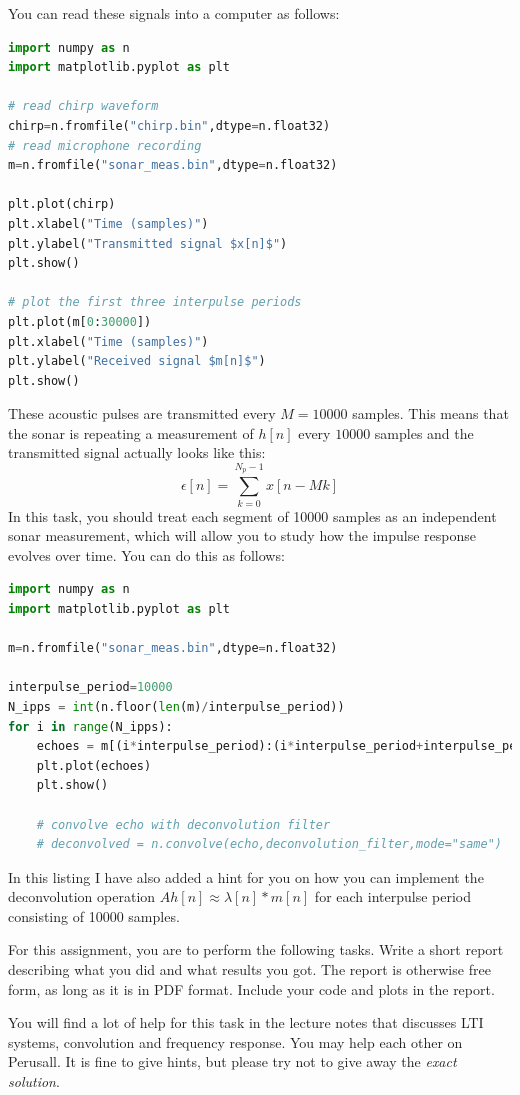 You can read these signals into a
computer as follows:
\begin{lstlisting}[language=Python,numbers=none]
import numpy as n
import matplotlib.pyplot as plt

# read chirp waveform
chirp=n.fromfile("chirp.bin",dtype=n.float32)
# read microphone recording 
m=n.fromfile("sonar_meas.bin",dtype=n.float32)

plt.plot(chirp)
plt.xlabel("Time (samples)")
plt.ylabel("Transmitted signal $x[n]$")
plt.show()

# plot the first three interpulse periods 
plt.plot(m[0:30000])
plt.xlabel("Time (samples)")
plt.ylabel("Received signal $m[n]$")
plt.show()
\end{lstlisting}
These acoustic pulses are transmitted every $M=10000$ samples. This
means that the sonar is repeating a measurement of $h[n]$ every
$10000$ samples and the transmitted signal actually looks like this:
\begin{equation}
  \epsilon[n] = \sum_{k=0}^{N_p-1} x[n - Mk]
\end{equation}
In this task, you should treat each segment of 10000 samples as an
independent sonar measurement, which will allow you to study how the
impulse response evolves over time. You can do this as follows:
\begin{lstlisting}[language=Python,numbers=none]
import numpy as n
import matplotlib.pyplot as plt

m=n.fromfile("sonar_meas.bin",dtype=n.float32)

interpulse_period=10000
N_ipps = int(n.floor(len(m)/interpulse_period))
for i in range(N_ipps):
    echoes = m[(i*interpulse_period):(i*interpulse_period+interpulse_period)]
    plt.plot(echoes)
    plt.show()

    # convolve echo with deconvolution filter
    # deconvolved = n.convolve(echo,deconvolution_filter,mode="same")
\end{lstlisting}
In this listing I have also added a hint for you on how you can
implement the deconvolution operation $A h[n] \approx
\lambda[n]*m[n]$ for each interpulse period consisting of 10000 samples.

For this assignment, you are to perform the following tasks. Write a
short report describing what you did and what results you got. The
report is otherwise free form, as long as it is in PDF format. Include
your code and plots in the report. 

You will find a lot of help for this task in the lecture notes that
discusses LTI systems, convolution and frequency response. You may
help each other on Perusall. It is fine to give hints, but please try
not to give away the \emph{exact solution}.

